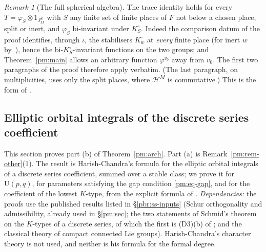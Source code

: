 \documentclass[10pt]{amsart}
\theoremstyle{definition}
\theoremstyle{remark}
\newtheorem{remark}[theorem]{Remark}
\providecommand{\auU}{\mathrm U}
\providecommand{\aubar}[1]{\overline{#1}}
\begin{document}
\begin{remark}[The full spherical algebra]\label{pm:rem-full}
The trace identity holds for every $T=\varphi_S\otimes1_{J_M^S}$ with $S$ any finite set of finite places
of $F$ not below a chosen place, split or inert, and $\varphi_S$ bi-invariant under $K^\circ_S$. Indeed the
comparison datum of the proof identifies, through $\iota$, the stabilisers $K^\circ_w$ at \emph{every}
finite place (for inert $w$ by~\cite{Jacobowitz}), hence the bi-$K^\circ_S$-invariant functions on the two
groups; and Theorem~\ref{pm:main} allows an arbitrary function $\varphi^{v_0}$ away from $v_0$. The first two
paragraphs of the proof therefore apply verbatim. (The last paragraph, on multiplicities, uses only the
split places, where $\mathcal H^M$ is commutative.) This is the form of {\cite[Proposition~14.36]{P46}}.
\end{remark}



\providecommand{\auU}{\mathrm U}
\providecommand{\aubar}[1]{\overline{#1}}
\providecommand{\pcom}{\mathsf m}
\providecommand{\pcoD}{\mathsf D}
\providecommand{\pcoH}{\mathsf H}
\providecommand{\pbrB}{\mathsf B}
\providecommand{\pbrN}{\mathsf N}
\providecommand{\pbrn}{\mathfrak n}
\providecommand{\pbrK}{K}
\providecommand{\pbrW}{W_K}
\providecommand{\pbrlev}{\ell}
\providecommand{\pbrsgn}{\operatorname{sgn}}
\providecommand{\pbrAlt}{\mathsf A}
\providecommand{\pbrTp}{T^{+}}
\providecommand{\pbrTh}{\Theta}
\providecommand{\pbrE}{\mathcal E}
\providecommand{\pbrdc}{\delta_{\mathrm c}}
\providecommand{\pbrdD}{\delta_{D}}
\providecommand{\pbrtop}{\tau}
\providecommand{\pbrLo}{\Lambda^{\circ}}
\providecommand{\pbrNo}{N^{\circ}}
\providecommand{\pbrO}{\mathcal O}
\providecommand{\pbrre}{\operatorname{Re}}

\subsection{Elliptic orbital integrals of the discrete series coefficient}\label{pbr:sec}

This section proves part (b) of Theorem~\ref{pm:arch}. Part (a) is Remark~\ref{pm:rem-other}(1).
The result is Harish-Chandra's formula for the elliptic orbital integrals of a discrete series
coefficient, summed over a stable class; we prove it for $\auU(p,q)$, for parameters satisfying the
gap condition \eqref{pm:eq-gap}, and for the coefficient of the lowest $K$-type, from the explicit
formula of {\cite[Theorem~3.17]{P49}}. \emph{Dependencies:} the proofs use the published results listed
in \S\ref{pbr:ss-inputs} (Schur orthogonality and admissibility, already used in
\S\ref{pm:sec}; the two statements of Schmid's theorem on the $K$-types of a discrete series, of
which the first is (D3)(b) of {\cite[\S3.1.3]{P49}}; and the classical theory of compact connected Lie
groups). Harish-Chandra's character theory is not used, and neither is his formula for the formal
degree.
\end{document}

